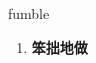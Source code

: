 
\begin{frame}
{\huge fumble}
\begin{center}
\begin{enumerate}\Large
  \item \textbf{笨拙地做}
\end{enumerate}
\end{center}
\end{frame}
